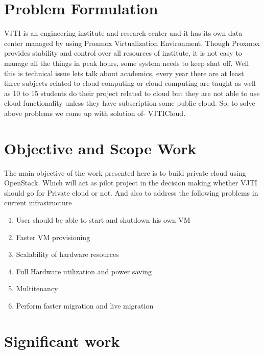 \section{Problem Formulation}
 \par
 
 \par VJTI is an engineering institute and research center and it has its own data center managed by using Proxmox Virtualization Environment. Though Proxmox provides stability and control over all resources of institute, it is not easy to manage all the things in peak hours, some system needs to keep shut off. Well this is technical issue lets talk about academics, every year there are at least three subjects related to cloud computing or cloud computing are taught as well as 10 to 15 students do their project related to cloud but they are not able to use cloud functionality unless they have subscription some public cloud. So, to solve above problems we come up with solution of- VJTICloud.

\section{Objective and Scope Work}

The main objective of the work presented here is to build private cloud using OpenStack\cite{openstack}. Which will act as pilot project in the decision making whether VJTI should go for Private cloud or not. And also to address the following problems in current infrastructure 

\begin{enumerate}
  \item User should be able to start and shutdown his own VM
  \item Faster VM provisioning
  \item Scalability of hardware resources
  \item Full Hardware utilization and power saving %
  \item Multitenancy %
  \item Perform faster migration and live migration %
\end{enumerate}


\section{Significant work}

